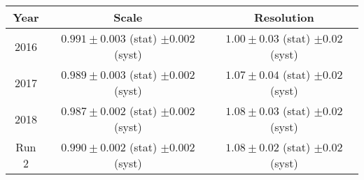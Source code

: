 \footnotesize
\begin{tabular}{c|c|c}
  \hline
  Year & Scale & Resolution \\
  \hline
  \hline
  2016  & $0.991 \pm 0.003$ (stat) $\pm 0.002$ (syst) & $1.00 \pm 0.03$ (stat) $\pm 0.02$ (syst) \\
  2017  & $0.989 \pm 0.003$ (stat) $\pm 0.002$ (syst) & $1.07 \pm 0.04$ (stat) $\pm 0.02$ (syst) \\
  2018  & $0.987 \pm 0.002$ (stat) $\pm 0.002$ (syst) & $1.08 \pm 0.03$ (stat) $\pm 0.02$ (syst) \\
  Run 2 & $0.990 \pm 0.002$ (stat) $\pm 0.002$ (syst) & $1.08 \pm 0.02$ (stat) $\pm 0.02$ (syst) \\
  \hline
\end{tabular}
